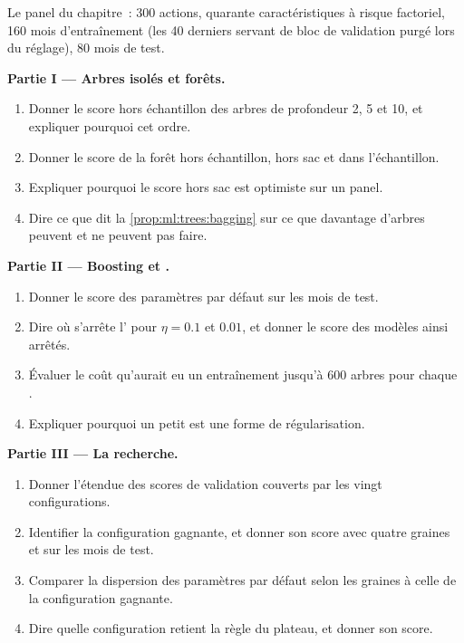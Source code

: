 \begin{problem}\label{pb:ml:trees-and-boosting:1}
Le panel du chapitre~: 300 actions, quarante caractéristiques à risque factoriel, 160 mois d'entraînement (les 40 derniers servant de
bloc de validation purgé lors du réglage), 80 mois de test.

\medskip\noindent\textbf{Partie I --- Arbres isolés et forêts.}
\begin{enumerate}
\item Donner le score hors échantillon des arbres de profondeur 2, 5 et 10, et expliquer pourquoi cet ordre.
\item Donner le score de la forêt hors échantillon, hors sac et dans l'échantillon.
\item Expliquer pourquoi le score hors sac est optimiste sur un panel.
\item Dire ce que dit la \cref{prop:ml:trees:bagging} sur ce que davantage d'arbres peuvent et ne peuvent pas faire.
\end{enumerate}

\medskip\noindent\textbf{Partie II --- Boosting et .}
\begin{enumerate}[resume]
\item Donner le score des paramètres par défaut sur les mois de test.
\item Dire où s'arrête l' pour $\eta = 0.1$ et $0.01$, et donner le score des modèles ainsi arrêtés.
\item Évaluer le coût qu'aurait eu un entraînement jusqu'à 600 arbres pour chaque .
\item Expliquer pourquoi un petit  est une forme de régularisation.
\end{enumerate}

\medskip\noindent\textbf{Partie III --- La recherche.}
\begin{enumerate}[resume]
\item Donner l'étendue des scores de validation couverts par les vingt configurations.
\item Identifier la configuration gagnante, et donner son score avec quatre graines et sur les mois de test.
\item Comparer la dispersion des paramètres par défaut selon les graines à celle de la configuration gagnante.
\item Dire quelle configuration retient la règle du plateau, et donner son score.
\end{enumerate}


\end{problem}
